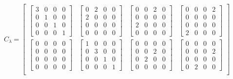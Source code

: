 \documentclass[twocolumn,10pt]{asme2ej}
\begin{document}
\begin{equation}
    C_{\lambda} = \begin{bmatrix}
    \begin{bmatrix} 3 & 0 & 0 & 0 \\ 0 & 1 & 0 & 0 \\ 0 & 0 & 1 & 0 \\ 0 & 0 & 0 & 1 \end{bmatrix} &
    \begin{bmatrix} 0 & 2 & 0 & 0 \\ 2 & 0 & 0 & 0 \\ 0 & 0 & 0 & 0 \\ 0 & 0 & 0 & 0 \end{bmatrix} &
    \begin{bmatrix} 0 & 0 & 2 & 0 \\ 0 & 0 & 0 & 0 \\ 2 & 0 & 0 & 0 \\ 0 & 0 & 0 & 0 \end{bmatrix} &
    \begin{bmatrix}0 & 0 & 0 & 2 \\ 0 & 0 & 0 & 0 \\ 0 & 0 & 0 & 0 \\ 2 & 0 & 0 & 0 \end{bmatrix} \\
      \begin{bmatrix} 0 & 0 & 0 & 0 \\ 0 & 0 & 0 & 0 \\ 0 & 0 & 0 & 0 \\ 0 & 0 & 0 & 0 \end{bmatrix} &
      \begin{bmatrix} 1 & 0 & 0 & 0 \\ 0 & 3 & 0 & 0 \\ 0 & 0 & 1 & 0 \\ 0 & 0 & 0 & 1 \end{bmatrix} &
      \begin{bmatrix} 0 & 0 & 0 & 0 \\ 0 & 0 & 2 & 0 \\ 0 & 2 & 0 & 0 \\ 0 & 0 & 0 & 0 \end{bmatrix} &
      \begin{bmatrix}0 & 0 & 0 & 0 \\ 0 & 0 & 0 & 2 \\ 0 & 0 & 0 & 0 \\ 0 & 2 & 0 & 0 \end{bmatrix} \\

\end{bmatrix}
\end{equation}
\end{document}
